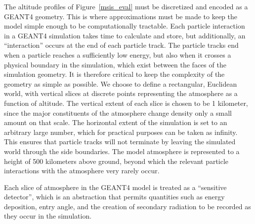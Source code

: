The altitude profiles of Figure~\ref{msis_eval} must be discretized and encoded as a GEANT4 geometry. This is where approximations must be made to keep the model simple enough to be computationally tractable. Each particle interaction in a GEANT4 simulation takes time to calculate and store, but additionally, an ``interaction'' occurs at the end of each particle track. The particle tracks end when a particle reaches a sufficiently low energy, but also when it crosses a physical boundary in the simulation, which exist between the faces of the simulation geometry. It is therefore critical to keep the complexity of the geometry as simple as possible. We choose to define a rectangular, Euclidean world, with vertical slices at discrete points representing the atmosphere as a function of altitude. The vertical extent of each slice is chosen to be 1 kilometer, since the major constituents of the atmosphere change density only a small amount on that scale. The horizontal extent of the simulation is set to an arbitrary large number, which for practical purposes can be taken as infinity. This ensures that particle tracks will not terminate by leaving the simulated world through the side boundaries. The model atmosphere is represented to a height of 500 kilometers above ground, beyond which the relevant particle interactions with the atmosphere very rarely occur. 

Each slice of atmosphere in the GEANT4 model is treated as a ``sensitive detector'', which is an abstraction that permits quantities such as energy deposition, entry angle, and the creation of secondary radiation to be recorded as they occur in the simulation. 
    
